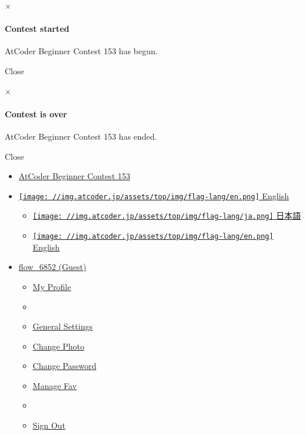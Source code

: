 ×

\paragraph{Contest started}

AtCoder Beginner Contest 153 has begun.

Close

×

\paragraph{Contest is over}

AtCoder Beginner Contest 153 has ended.

Close

\href{/home}{}

\begin{itemize}
\tightlist
\item
  \href{/contests/abc153}{AtCoder Beginner Contest 153}
\end{itemize}

\begin{itemize}
\tightlist
\item
  \protect\hyperlink{}{\texttt{[image: //img.atcoder.jp/assets/top/img/flag-lang/en.png]}
    English}

  \begin{itemize}
  \tightlist
  \item
    \href{/contests/abc153/tasks/abc153_a?lang=ja}{\texttt{[image: //img.atcoder.jp/assets/top/img/flag-lang/ja.png]}
    日本語}
  \item
    \href{/contests/abc153/tasks/abc153_a?lang=en}{\texttt{[image: //img.atcoder.jp/assets/top/img/flag-lang/en.png]}
    English}
  \end{itemize}
\item
  \protect\hyperlink{}{flow\_6852 (Guest)}

  \begin{itemize}
  \item
    \href{/users/flow_6852}{My Profile}
  \item
  \item
    \href{/settings}{General Settings}
  \item
    \href{/settings/icon}{Change Photo}
  \item
    \href{/settings/password}{Change Password}
  \item
    \href{/settings/fav}{Manage Fav}
  \item
  \item
    \href{javascript:void(form_logout.submit())}{Sign Out}
  \end{itemize}
\end{itemize}

